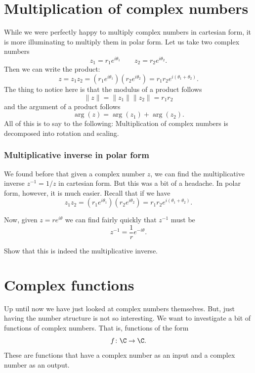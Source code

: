        
        \section{Multiplication of complex numbers}
        
        While we were perfectly happy to multiply complex numbers in cartesian form, it is more illuminating to multiply them in polar form.  Let us take two complex numbers
        \[
        z_1 = r_1 e^{i\theta_1} \qquad z_2 = r_2 e^{i\theta_2}.
        \]
        Then we can write the product:
        \[
        z=z_1 z_2 = (r_1 e^{i\theta_1})(r_2 e^{i\theta_2})= r_1r_2 e^{i(\theta_1+\theta_2)}.
        \]
        The thing to notice here is that the modulus of a product follows
        \[
        \|z\|=\|z_1\|\|z_2\|=r_1r_2
        \]
        and the argument of a product follows
        \[
        \arg(z)=\arg(z_1)+\arg(z_2).
        \]
        All of this is to say to the following: Multiplication of complex numbers is decomposed into rotation and scaling.
    
    
        \subsubsection{Multiplicative inverse in polar form}
        We found before that given a complex number $z$, we can find the multiplicative inverse $z^{-1}=1/z$ in cartesian form.  But this was a bit of a headache.  In polar form, however, it is much easier.  Recall that if we have
        \[
        z_1 z_2 = \left(r_1e^{i\theta_1}\right)\left(r_2e^{i\theta_2}\right)=r_1r_2e^{i(\theta_1+\theta_2)}.
        \]
        
        Now, given $z=re^{i\theta}$ we can find fairly quickly that $z^{-1}$ must be
        \[
        z^{-1}=\frac{1}{r}e^{-i\theta}.
        \]
        
        \begin{exercise}
        Show that this is indeed the multiplicative inverse.
        \end{exercise}
        
        \section{Complex functions}
        Up until now we have just looked at complex numbers themselves.  But, just having the number structure is not so interesting.  We want to investigate a bit of functions of complex numbers.  That is, functions of the form
        \[
        f\colon \C \to \C.
        \]
        These are functions that have a complex number as an input and a complex number as an output. 
        
